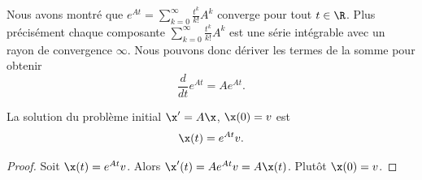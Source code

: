   Nous avons montré que $e^{At} = \sum_{k=0}^\infty \frac{t^k}{k!} A^k$ converge pour tout $t \in \R$. Plus précisément chaque composante $\sum_{k=0}^\infty \frac{t^k}{k!} A^k$ est une série intégrable avec un rayon de convergence $\infty$.
Nous pouvons donc dériver les termes de la somme pour obtenir 
\begin{equation}
  \label{eq:24}
  \frac{d}{dt} e^{At} = A e^{At}. 
\end{equation}


\begin{theorem}
  \label{thr:31}
  La solution du problème initial $\x' = A\x$, $\x(0) =v$ est 
  \begin{displaymath}
    \x(t) = e^{At} v.
  \end{displaymath}
\end{theorem}

\begin{proof}
  Soit $\x(t) = e^{At} v$. Alors $\x'(t) = A e^{At}v = A\x(t)$. Plutôt $\x(0) = v$. 
\end{proof}


